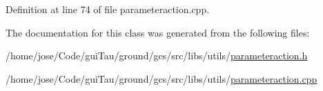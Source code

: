 Definition at line 74 of file parameteraction.\-cpp.



The documentation for this class was generated from the following files\-:\begin{DoxyCompactItemize}
\item 
/home/jose/\-Code/gui\-Tau/ground/gcs/src/libs/utils/\hyperlink{parameteraction_8h}{parameteraction.\-h}\item 
/home/jose/\-Code/gui\-Tau/ground/gcs/src/libs/utils/\hyperlink{parameteraction_8cpp}{parameteraction.\-cpp}\end{DoxyCompactItemize}
